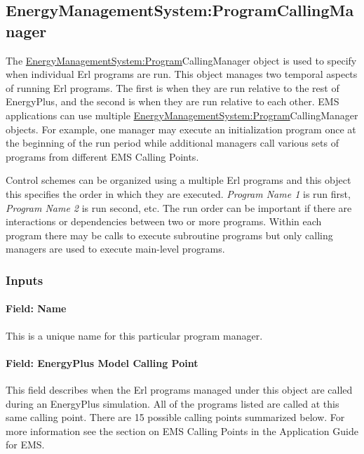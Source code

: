 \subsection{EnergyManagementSystem:ProgramCallingManager}\label{energymanagementsystemprogramcallingmanager}

The \hyperref[energymanagementsystemprogram]{EnergyManagementSystem:Program}CallingManager object is used to specify when individual Erl programs are run. This object manages two temporal aspects of running Erl programs. The first is when they are run relative to the rest of EnergyPlus, and the second is when they are run relative to each other. EMS applications can use multiple \hyperref[energymanagementsystemprogram]{EnergyManagementSystem:Program}CallingManager objects. For example, one manager may execute an initialization program once at the beginning of the run period while additional managers call various sets of programs from different EMS Calling Points.

Control schemes can be organized using a multiple Erl programs and this object this specifies the order in which they are executed. \emph{Program Name 1} is run first, \emph{Program Name 2} is run second, etc. The run order can be important if there are interactions or dependencies between two or more programs. Within each program there may be calls to execute subroutine programs but only calling managers are used to execute main-level programs.

\subsubsection{Inputs}\label{inputs-2-012}

\paragraph{Field: Name}\label{field-name-2-011}

This is a unique name for this particular program manager.

\paragraph{Field: EnergyPlus Model Calling Point}\label{field-energyplus-model-calling-point}

This field describes when the Erl programs managed under this object are called during an EnergyPlus simulation. All of the programs listed are called at this same calling point. There are 15 possible calling points summarized below. For more information see the section on EMS Calling Points in the Application Guide for EMS.

